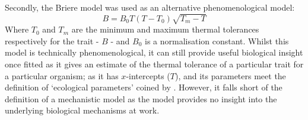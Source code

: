\documentclass[twoside,twocolumn,11pt]{article}
\begin{document}
Secondly, the Briere model \citep{Briere1999} was used as an alternative phenomenological model:
\begin{equation}
  B = B_0T(T - T_{0})\sqrt{T_{m} - T}
\end{equation}
Where $T_{0}$ and $T_{m}$ are the minimum and maximum thermal tolerances respectively for the trait - $B$ - and $B_0$ 
is a normalisation constant. Whilst this model is technically phenomenological, it can still provide useful 
biological insight once fitted as it gives an estimate of the thermal
tolerance of a particular trait for a particular organism; as it has $x$-intercepts ($T$), and its parameters meet the definition of `ecological
parameters' coined by \citep{Lamb1984}. However, it falls short of the definition
of a mechanistic model as the model provides no insight into the underlying biological mechanisms at work.
\end{document}
